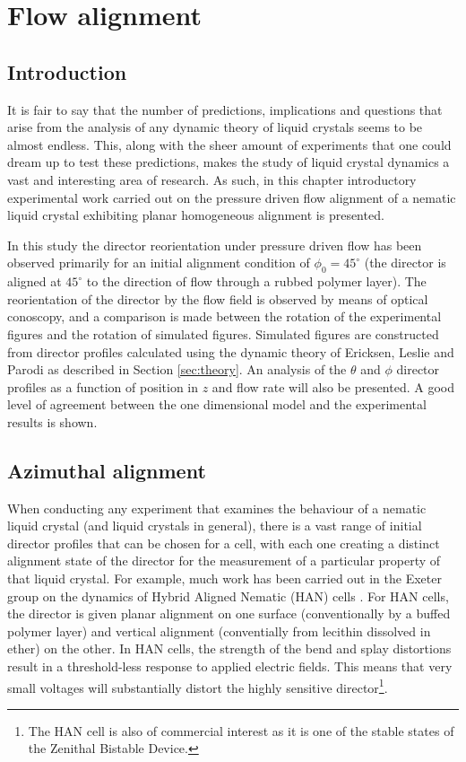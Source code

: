 \chapter{Flow alignment}
\label{cha:45}
\section{Introduction}
It is fair to say that the number of predictions, implications and questions that arise from the analysis of any dynamic theory of liquid crystals seems to be almost endless. This, along with the sheer amount of experiments that one could dream up to test these predictions, makes the study of liquid crystal dynamics a vast and interesting area of research. As such, in this chapter introductory experimental work carried out on the pressure driven flow alignment of a nematic liquid crystal exhibiting planar homogeneous alignment is presented.

In this study the director reorientation under pressure driven flow has been observed primarily for an initial alignment condition of $\phi_0=45^{\circ}$ (the director is aligned at $45^{\circ}$ to the direction of flow through a rubbed polymer layer). The reorientation of the director by the flow field is observed by means of optical conoscopy, and a comparison is made between the rotation of the experimental figures and the rotation of simulated figures. Simulated figures are constructed from director profiles calculated using the dynamic theory of Ericksen, Leslie and Parodi as described in Section \ref{sec:theory}. An analysis of the $\theta$ and $\phi$ director profiles as a function of position in $z$ and flow rate will also be presented. A good level of agreement between the one dimensional model and the experimental results is shown.

\section{Azimuthal alignment}
When conducting any experiment that examines the behaviour of a nematic liquid crystal (and liquid crystals in general), there is a vast range of initial director profiles that can be chosen for a cell, with each one creating a distinct alignment state of the director for the measurement of a particular property of that liquid crystal. For example, much work has been carried out in the Exeter group on the dynamics of Hybrid Aligned Nematic (HAN) cells \cite{Jewell2003,Jewell2004,Jewell2005,Yang2007,Jewell2002a}. For HAN cells, the director is given planar alignment on one surface (conventionally by a buffed polymer layer) and vertical alignment (conventially from lecithin dissolved in ether) on the other. In HAN cells, the strength of the bend and splay distortions result in a threshold-less response to applied electric fields. This means that very small voltages will substantially distort the highly sensitive director\footnote{The HAN cell is also of commercial interest as it is one of the stable states of the Zenithal Bistable Device.}.

